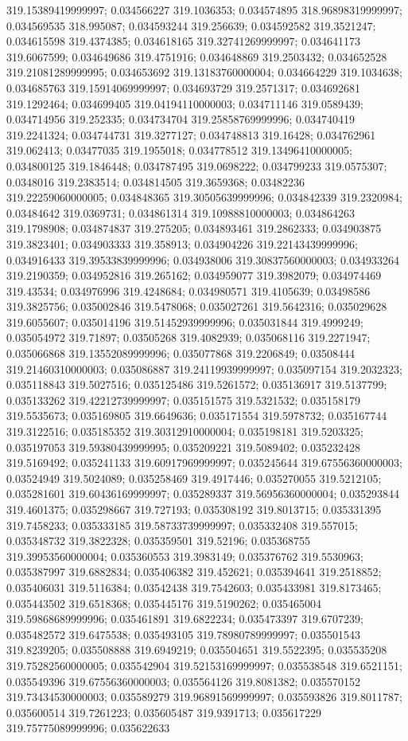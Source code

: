 319.15389419999997; 0.034566227 319.1036353; 0.034574895 318.96898319999997; 0.034569535 318.995087; 0.034593244 319.256639; 0.034592582 319.3521247; 0.034615598 319.4374385; 0.034618165 319.32741269999997; 0.034641173 319.6067599; 0.034649686 319.4751916; 0.034648869 319.2503432; 0.034652528 319.21081289999995; 0.034653692 319.13183760000004; 0.034664229 319.1034638; 0.034685763 319.15914069999997; 0.034693729 319.2571317; 0.034692681 319.1292464; 0.034699405 319.04194110000003; 0.034711146 319.0589439; 0.034714956 319.252335; 0.034734704 319.25858769999996; 0.034740419 319.2241324; 0.034744731 319.3277127; 0.034748813 319.16428; 0.034762961 319.062413; 0.03477035 319.1955018; 0.034778512 319.13496410000005; 0.034800125 319.1846448; 0.034787495 319.0698222; 0.034799233 319.0575307; 0.0348016 319.2383514; 0.034814505 319.3659368; 0.03482236 319.22259060000005; 0.034848365 319.30505639999996; 0.034842339 319.2320984; 0.03484642 319.0369731; 0.034861314 319.10988810000003; 0.034864263 319.1798908; 0.034874837 319.275205; 0.034893461 319.2862333; 0.034903875 319.3823401; 0.034903333 319.358913; 0.034904226 319.22143439999996; 0.034916433 319.39533839999996; 0.034938006 319.30837560000003; 0.034933264 319.2190359; 0.034952816 319.265162; 0.034959077 319.3982079; 0.034974469 319.43534; 0.034976996 319.4248684; 0.034980571 319.4105639; 0.03498586 319.3825756; 0.035002846 319.5478068; 0.035027261 319.5642316; 0.035029628 319.6055607; 0.035014196 319.51452939999996; 0.035031844 319.4999249; 0.035054972 319.71897; 0.03505268 319.4082939; 0.035068116 319.2271947; 0.035066868 319.13552089999996; 0.035077868 319.2206849; 0.03508444 319.21460310000003; 0.035086887 319.24119939999997; 0.035097154 319.2032323; 0.035118843 319.5027516; 0.035125486 319.5261572; 0.035136917 319.5137799; 0.035133262 319.42212739999997; 0.035151575 319.5321532; 0.035158179 319.5535673; 0.035169805 319.6649636; 0.035171554 319.5978732; 0.035167744 319.3122516; 0.035185352 319.30312910000004; 0.035198181 319.5203325; 0.035197053 319.59380439999995; 0.035209221 319.5089402; 0.035232428 319.5169492; 0.035241133 319.60917969999997; 0.035245644 319.67556360000003; 0.03524949 319.5024089; 0.035258469 319.4917446; 0.035270055 319.5212105; 0.035281601 319.60436169999997; 0.035289337 319.56956360000004; 0.035293844 319.4601375; 0.035298667 319.727193; 0.035308192 319.8013715; 0.035331395 319.7458233; 0.035333185 319.58733739999997; 0.035332408 319.557015; 0.035348732 319.3822328; 0.035359501 319.52196; 0.035368755 319.39953560000004; 0.035360553 319.3983149; 0.035376762 319.5530963; 0.035387997 319.6882834; 0.035406382 319.452621; 0.035394641 319.2518852; 0.035406031 319.5116384; 0.03542438 319.7542603; 0.035433981 319.8173465; 0.035443502 319.6518368; 0.035445176 319.5190262; 0.035465004 319.59868689999996; 0.035461891 319.6822234; 0.035473397 319.6707239; 0.035482572 319.6475538; 0.035493105 319.78980789999997; 0.035501543 319.8239205; 0.035508888 319.6949219; 0.035504651 319.5522395; 0.035535208 319.75282560000005; 0.035542904 319.52153169999997; 0.035538548 319.6521151; 0.035549396 319.67556360000003; 0.035564126 319.8081382; 0.035570152 319.73434530000003; 0.035589279 319.96891569999997; 0.035593826 319.8011787; 0.035600514 319.7261223; 0.035605487 319.9391713; 0.035617229 319.75775089999996; 0.035622633 